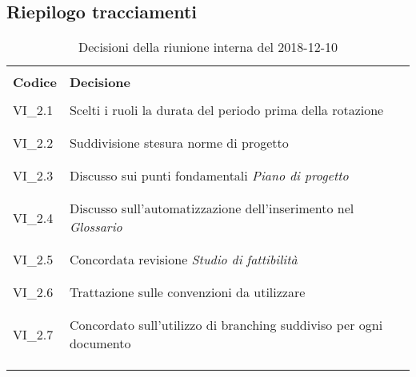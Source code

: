 \subsection{Riepilogo tracciamenti}
\begin{centering}
\begin{longtable}{ >{\centering}p{4cm} >{\centering}p{11cm} }

\hline
\\[0.5pt]
	\textbf{Codice} & \textbf{Decisione} 
	
	\tabularnewline 
	\hline
	
	
				\\[0.5pt]
				VI\_2.1 & Scelti i ruoli la durata del periodo prima della rotazione
				\\[0.5pt]
				\tabularnewline
				\hline
						
				\\[0.5pt]
				VI\_2.2 & Suddivisione stesura norme di progetto
				\\[0.5pt]
				\tabularnewline
				\hline
				
				\\[0.5pt]
				VI\_2.3 & Discusso sui punti fondamentali \textit{Piano di progetto}
				\\[0.5pt]
				\tabularnewline
				\hline
				
				\\[0.5pt]				
				VI\_2.4 & Discusso sull'automatizzazione dell'inserimento nel \textit{Glossario}
				\\[0.5pt]
				\tabularnewline
				\hline
				
				\\[0.5pt]
				VI\_2.5 & Concordata revisione \textit{Studio di fattibilità} 
				\\[0.5pt]
				\tabularnewline
				\hline
				
				\\[0.5pt]
				VI\_2.6 & Trattazione sulle convenzioni da utilizzare
				\\[0.5pt]
				\tabularnewline
				\hline
		
				\\[0.5pt]
				VI\_2.7 & Concordato sull'utilizzo di branching suddiviso per ogni documento
				\\[0.5pt]
				\tabularnewline
				\hline          	
                
        \\[0.7pt]
        \caption{Decisioni della riunione interna del 2018-12-10}
\end{longtable}
\end{centering}

